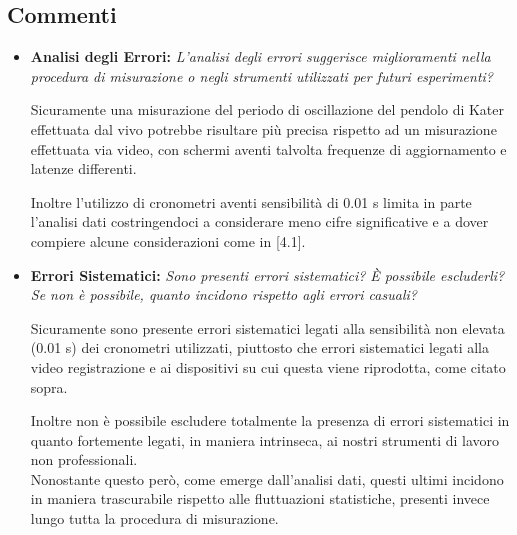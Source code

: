 \documentclass{article}
\begin{document}
\subsection{Commenti}
\begin{itemize}
    \item \textbf{Analisi degli Errori:} \textit{L'analisi degli errori suggerisce miglioramenti nella procedura di misurazione o negli strumenti utilizzati per futuri esperimenti?}
    
    Sicuramente una misurazione del periodo di oscillazione del pendolo di Kater effettuata dal vivo potrebbe risultare più precisa rispetto ad un misurazione effettuata via video, con schermi aventi talvolta frequenze di aggiornamento e latenze differenti.
    
    Inoltre l'utilizzo di cronometri aventi sensibilità di 0.01 s limita in parte l'analisi dati costringendoci a considerare meno cifre significative e a dover compiere alcune considerazioni come in [4.1]. 
    
    \item \textbf{Errori Sistematici:} \textit{Sono presenti errori sistematici? È possibile escluderli? Se non è possibile, quanto incidono rispetto agli errori casuali?}

    Sicuramente sono presente errori sistematici legati alla sensibilità non elevata (0.01 s) dei cronometri utilizzati, piuttosto che errori sistematici legati alla video registrazione e ai dispositivi su cui questa viene riprodotta, come citato sopra.
    
    Inoltre non è possibile escludere totalmente la presenza di errori sistematici in quanto fortemente legati, in maniera intrinseca, ai nostri strumenti di lavoro non professionali.
    \\Nonostante questo però, come emerge dall'analisi dati, questi ultimi incidono in maniera trascurabile rispetto alle fluttuazioni statistiche, presenti invece lungo tutta la procedura di misurazione.
    
\end{itemize}
\end{document}
